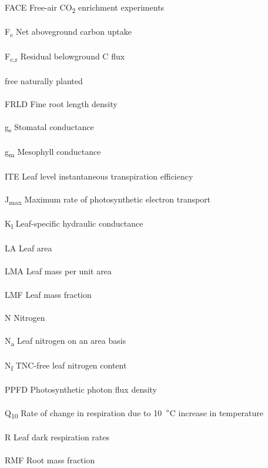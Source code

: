 \documentclass[a4paper]{article}
\begin{document}
\\
FACE Free-air CO\textsubscript{2} enrichment experiments
\\
\\
F\textsubscript{c}  Net aboveground carbon uptake
\\
\\
F\textsubscript{c,r}  Residual belowground C flux
\\
\\
free  naturally planted
\\
\\
FRLD Fine root length density
\\
\\
g\textsubscript{s}  Stomatal conductance
\\
\\
g\textsubscript{m}  Mesophyll conductance
\\
\\
ITE Leaf level instantaneous transpiration efficiency
\\
\\
J\textsubscript{max} Maximum rate of photosynthetic electron transport 
\\
\\
K\textsubscript{l} Leaf-specific hydraulic conductance 
\\
\\
LA Leaf area
\\
\\
LMA Leaf mass per unit area
\\
\\
LMF Leaf mass fraction
\\
\\
N  Nitrogen
\\
\\
N\textsubscript{a} Leaf nitrogen on an area basis
\\
\\
N\textsubscript{f} TNC-free leaf nitrogen content
\\
\\
PPFD  Photosynthetic photon flux density
\\
\\
Q\textsubscript{10} Rate of change in respiration due to 10~$\degree$C increase in temperature
\\
\\
R Leaf dark respiration rates
\\
\\
RMF Root mass fraction
\\
\\
\end{document}
